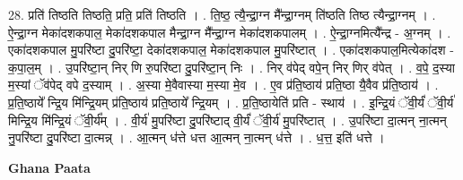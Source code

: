 \documentclass[17pt]{extarticle}
\begin{document}
28. प्रति॑ तिष्ठति तिष्ठति॒ प्रति॒ प्रति॑ तिष्ठति । . ति॒ष्ठ॒ त्यै॒न्द्रा॒ग्न मै᳚न्द्रा॒ग्नम् ति॑ष्ठति तिष्ठ त्यैन्द्रा॒ग्नम् । . ऐ॒न्द्रा॒ग्न मेका॑दशकपाल॒ मेका॑दशकपाल मैन्द्रा॒ग्न मै᳚न्द्रा॒ग्न मेका॑दशकपालम् । . ऐ॒न्द्रा॒ग्नमित्यै᳚न्द्र - अ॒ग्नम् । . एका॑दशकपाल मु॒परि॑ष्टा दु॒परि॑ष्टा॒ देका॑दशकपाल॒ मेका॑दशकपाल मु॒परि॑ष्टात् । . एका॑दशकपाल॒मित्येका॑दश - क॒पा॒ल॒म् । . उ॒परि॑ष्टा॒न् निर् णि रु॒परि॑ष्टा दु॒परि॑ष्टा॒न् निः । . निर् व॑पेद् वपे॒न् निर् णिर् व॑पेत् । . व॒पे॒ द॒स्या म॒स्यां ॅव॑पेद् वपे द॒स्याम् । . अ॒स्या मे॒वैवास्या म॒स्या मे॒व । . ए॒व प्र॑ति॒ष्ठाय॑ प्रति॒ष्ठा यै॒वैव प्र॑ति॒ष्ठाय॑ । . प्र॒ति॒ष्ठाये᳚ न्द्रि॒य मि॑न्द्रि॒यम् प्र॑ति॒ष्ठाय॑ प्रति॒ष्ठाये᳚ न्द्रि॒यम् । . प्र॒ति॒ष्ठायेति॑ प्रति - स्थाय॑ । . इ॒न्द्रि॒यं ॅवी॒र्यं॑ ॅवी॒र्य॑ मिन्द्रि॒य मि॑न्द्रि॒यं ॅवी॒र्य᳚म् । . वी॒र्य॑ मु॒परि॑ष्टा दु॒परि॑ष्टाद् वी॒र्यं॑ ॅवी॒र्य॑ मु॒परि॑ष्टात् । . उ॒परि॑ष्टा दा॒त्मन् ना॒त्मन् नु॒परि॑ष्टा दु॒परि॑ष्टा दा॒त्मन्न् । . आ॒त्मन् ध॑त्ते धत्त आ॒त्मन् ना॒त्मन् ध॑त्ते । . ध॒त्त॒ इति॑ धत्ते । \newline

\textbf{Ghana Paata } \newline
\end{document}
